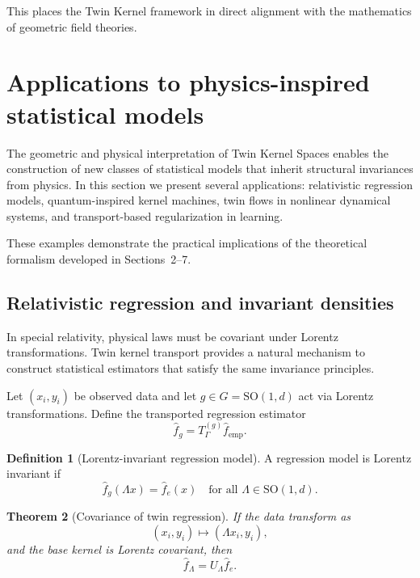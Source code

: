 \documentclass[11pt]{article}
\newtheorem{theorem}{Theorem}[section]
\theoremstyle{definition}
\newtheorem{definition}[theorem]{Definition}
\begin{document}
This places the Twin Kernel framework in direct alignment with the mathematics of geometric field theories.

	
\section{Applications to physics-inspired statistical models}
\label{sec:applications}

The geometric and physical interpretation of Twin Kernel Spaces enables the construction of new classes of statistical models that inherit structural invariances from physics.
In this section we present several applications: relativistic regression models, quantum-inspired kernel machines, twin flows in nonlinear dynamical systems, and transport-based regularization in learning.

These examples demonstrate the practical implications of the theoretical formalism developed in Sections~2--7.

\subsection{Relativistic regression and invariant densities}

In special relativity, physical laws must be covariant under Lorentz transformations.
Twin kernel transport provides a natural mechanism to construct statistical estimators that satisfy the same invariance principles.

Let $(x_i,y_i)$ be observed data and let $g\in G=\mathrm{SO}(1,d)$ act via Lorentz transformations.
Define the transported regression estimator
\[
\widehat f_g = T_\Gamma^{(g)} \widehat f_{\mathrm{emp}}.
\]

\begin{definition}[Lorentz-invariant regression model]
	A regression model is Lorentz invariant if
	\[
	\widehat f_g(\Lambda x) = \widehat f_e(x)
	\quad\text{for all }\Lambda\in\mathrm{SO}(1,d).
	\]
\end{definition}

\begin{theorem}[Covariance of twin regression]
	If the data transform as
	\[
	(x_i,y_i)\mapsto (\Lambda x_i, y_i),
	\]
	and the base kernel is Lorentz covariant, then
	\[
	\widehat f_\Lambda = U_\Lambda\widehat f_e.
	\]
\end{theorem}
\end{document}
